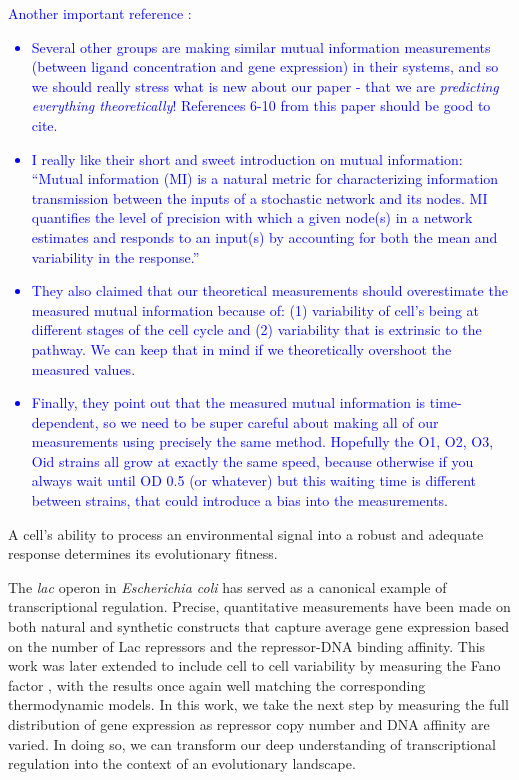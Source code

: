 \textcolor{blue}{Another important reference \cite{Chevalier2015}:
	\begin{itemize}
		\item Several other groups are making similar mutual information measurements (between ligand concentration and gene expression) in their systems, and so we should really stress what is new about our paper - that we are \textit{predicting everything theoretically}! References 6-10 from this paper should be good to cite.
		\item I really like their short and sweet introduction on mutual information: ``Mutual information (MI) is a natural metric for characterizing information transmission between the inputs of a stochastic network and its nodes. MI quantifies the level of precision with which a given node(s) in a network estimates and responds to an input(s) by accounting for both the mean and variability in the response.''
		\item They also claimed that our theoretical measurements should overestimate the measured mutual information because of: (1) variability of cell's being at different stages of the cell cycle and (2) variability that is extrinsic to the pathway. We can keep that in mind if we theoretically overshoot the measured values.
		\item Finally, they point out that the measured mutual information is time-dependent, so we need to be super careful about making all of our measurements using precisely the same method. Hopefully the O1, O2, O3, Oid strains all grow at exactly the same speed, because otherwise if you always wait until OD 0.5 (or whatever) but this waiting time is different between strains, that could introduce a bias into the measurements.
	\end{itemize}
	}

A cell's ability to process an environmental signal into a robust and adequate
response determines its evolutionary fitness.

The \textit{lac} operon in \textit{Escherichia coli} has served as a canonical
example of transcriptional regulation. Precise, quantitative measurements have
been made on both natural and synthetic constructs \cite{Garcia2011} that
capture average gene expression based on the number of Lac repressors and the
repressor-DNA binding affinity. This work was later extended to include cell to
cell variability by measuring the Fano factor \cite{Jones2014}, with the results
once again well matching the corresponding thermodynamic models. In this work,
we take the next step by measuring the full distribution of gene expression as
repressor copy number and DNA affinity are varied. In doing so, we can transform
our deep understanding of transcriptional regulation into the context of an
evolutionary landscape.


